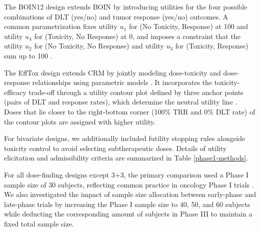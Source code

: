 \documentclass[11pt]{article}
\begin{document}
The BOIN12 design extends BOIN by introducing utilities for the four possible combinations of DLT (yes/no) and tumor response (yes/no) outcomes. A common parametrization fixes utility $u_1$ for (No Toxicity, Response) at 100 and utility $u_4$ for (Toxicity, No Response) at 0, and imposes a constraint that the utility $u_2$ for (No Toxicity, No Response) and utility $u_3$ for (Toxicity, Response) sum up to 100 \parencite{BOIN12}.

The EffTox design extends CRM by jointly modeling dose-toxicity and dose-response relationships using parametric models \parencite{EffTox}. It incorporates the toxicity-efficacy trade-off through a utility contour plot defined by three anchor points (pairs of DLT and response rates), which determine the neutral utility line \parencite{EffTox_hyperparameters}. Doses that lie closer to the right-bottom corner (100\% TRR and 0\% DLT rate) of the contour plots are assigned with higher utility.

For bivariate designs, we additionally included futility stopping rules alongside toxicity control to avoid selecting subtherapeutic doses. Details of utility elicitation and admissibility criteria are summarized in Table \ref{phase1-methods}.

For all dose-finding designs except 3+3, the primary comparison used a Phase I sample size of 30 subjects, reflecting common practice in oncology Phase I trials \parencite{li_phase_2024}. We also investigated the impact of sample size allocation between early-phase and late-phase trials by increasing the Phase I sample size to 40, 50, and 60 subjects while deducting the corresponding amount of subjects in Phase III to maintain a fixed total sample size. 
\end{document}
